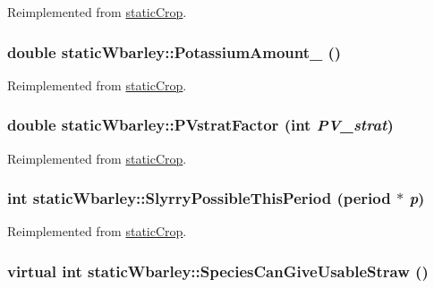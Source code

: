 Reimplemented from \hyperlink{classstatic_crop_abaa5c59d4074d47dedc79172f8326e08}{staticCrop}.\hypertarget{classstatic_wbarley_ac92789d3d8a25132f60546b85f92400b}{
\subsubsection[{PotassiumAmount\_\-}]{\setlength{\rightskip}{0pt plus 5cm}double staticWbarley::PotassiumAmount\_\- ()}}
\label{classstatic_wbarley_ac92789d3d8a25132f60546b85f92400b}


Reimplemented from \hyperlink{classstatic_crop_a41fee98d728c7670e6acb504a9b3459d}{staticCrop}.\hypertarget{classstatic_wbarley_a2d54e7d2ac7b1ca840dcb5d3780543b2}{
\subsubsection[{PVstratFactor}]{\setlength{\rightskip}{0pt plus 5cm}double staticWbarley::PVstratFactor (int {\em PV\_\-strat})}}
\label{classstatic_wbarley_a2d54e7d2ac7b1ca840dcb5d3780543b2}


Reimplemented from \hyperlink{classstatic_crop_ae4f07498c1616eab212386faf352d348}{staticCrop}.\hypertarget{classstatic_wbarley_a800178fb5dca9585040d0b9abd92d6b9}{
\subsubsection[{SlyrryPossibleThisPeriod}]{\setlength{\rightskip}{0pt plus 5cm}int staticWbarley::SlyrryPossibleThisPeriod ({\bf period} $\ast$ {\em p})}}
\label{classstatic_wbarley_a800178fb5dca9585040d0b9abd92d6b9}


Reimplemented from \hyperlink{classstatic_crop_ada7c8c797de629277a5ba0b0a4a3c17e}{staticCrop}.\hypertarget{classstatic_wbarley_a6abd8574805399b475df1488198bdd0f}{
\subsubsection[{SpeciesCanGiveUsableStraw}]{\setlength{\rightskip}{0pt plus 5cm}virtual int staticWbarley::SpeciesCanGiveUsableStraw ()}}
\label{classstatic_wbarley_a6abd8574805399b475df1488198bdd0f}


